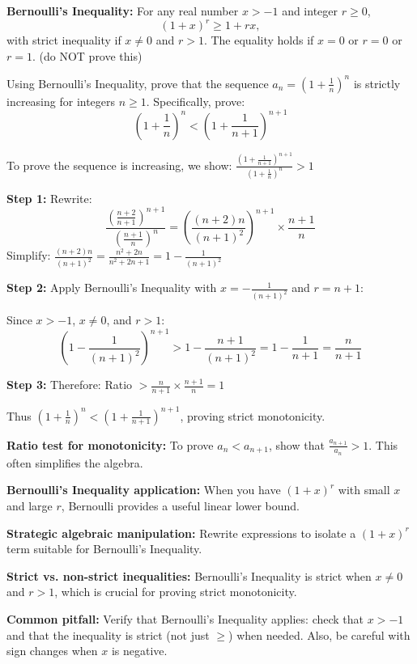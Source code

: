 \begin{problem}

\textbf{Bernoulli's Inequality:} For any real number $x > -1$ and integer $r \ge 0$,
\[(1 + x)^r \ge 1 + rx,
\]with strict inequality if $x \neq 0$ and $r > 1$. 
The equality holds if $x = 0$ or $r = 0$ or $r = 1$.
(do NOT prove this)

Using Bernoulli's Inequality, prove that the sequence $a_n = \left(1 + \frac{1}{n}\right)^n$ is strictly increasing for integers $n \ge 1$. Specifically, prove:
\[ \left(1 + \frac{1}{n}\right)^n < \left(1 + \frac{1}{n+1}\right)^{n+1} \]
\end{problem}

\begin{solution}
To prove the sequence is increasing, we show: $\frac{\left(1 + \frac{1}{n+1}\right)^{n+1}}{\left(1 + \frac{1}{n}\right)^n} > 1$

\textbf{Step 1:} Rewrite:
\[
\frac{\left(\frac{n+2}{n+1}\right)^{n+1}}{\left(\frac{n+1}{n}\right)^n} = \left( \frac{(n+2)n}{(n+1)^2} \right)^{n+1} \times \frac{n+1}{n}
\]
Simplify: $\frac{(n+2)n}{(n+1)^2} = \frac{n^2 + 2n}{n^2 + 2n + 1} = 1 - \frac{1}{(n+1)^2}$

\textbf{Step 2:} Apply Bernoulli's Inequality with $x = -\frac{1}{(n+1)^2}$ and $r = n+1$:

Since $x > -1$, $x \neq 0$, and $r > 1$:
\[
\left( 1 - \frac{1}{(n+1)^2} \right)^{n+1} > 1 - \frac{n+1}{(n+1)^2} = 1 - \frac{1}{n+1} = \frac{n}{n+1}
\]

\textbf{Step 3:} Therefore: Ratio $> \frac{n}{n+1} \times \frac{n+1}{n} = 1$

Thus $\left(1 + \frac{1}{n}\right)^n < \left(1 + \frac{1}{n+1}\right)^{n+1}$, proving strict monotonicity.
\end{solution}

\begin{takeaways}

    \item \textbf{Ratio test for monotonicity:} To prove $a_n < a_{n+1}$, show that $\frac{a_{n+1}}{a_n} > 1$. This often simplifies the algebra.
    \item \textbf{Bernoulli's Inequality application:} When you have $(1 + x)^r$ with small $x$ and large $r$, Bernoulli provides a useful linear lower bound.
    \item \textbf{Strategic algebraic manipulation:} Rewrite expressions to isolate a $(1 + x)^r$ term suitable for Bernoulli's Inequality.
    \item \textbf{Strict vs. non-strict inequalities:} Bernoulli's Inequality is strict when $x \neq 0$ and $r > 1$, which is crucial for proving strict monotonicity.
    \item \textbf{Common pitfall:} Verify that Bernoulli's Inequality applies: check that $x > -1$ and that the inequality is strict (not just $\geq$) when needed. Also, be careful with sign changes when $x$ is negative.

\end{takeaways}

